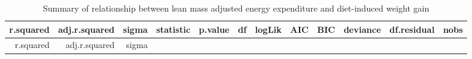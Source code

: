\documentclass[]{article}
\begin{document}
\begin{longtable}[]{@{}rrrrrrrrrrrr@{}}
\caption{Summary of relationship between lean mass adjusted energy
expenditure and diet-induced weight gain}\tabularnewline
\toprule
\begin{minipage}[b]{0.08\columnwidth}\raggedleft
r.squared\strut
\end{minipage} & \begin{minipage}[b]{0.11\columnwidth}\raggedleft
adj.r.squared\strut
\end{minipage} & \begin{minipage}[b]{0.05\columnwidth}\raggedleft
sigma\strut
\end{minipage} & \begin{minipage}[b]{0.08\columnwidth}\raggedleft
statistic\strut
\end{minipage} & \begin{minipage}[b]{0.06\columnwidth}\raggedleft
p.value\strut
\end{minipage} & \begin{minipage}[b]{0.02\columnwidth}\raggedleft
df\strut
\end{minipage} & \begin{minipage}[b]{0.05\columnwidth}\raggedleft
logLik\strut
\end{minipage} & \begin{minipage}[b]{0.03\columnwidth}\raggedleft
AIC\strut
\end{minipage} & \begin{minipage}[b]{0.03\columnwidth}\raggedleft
BIC\strut
\end{minipage} & \begin{minipage}[b]{0.07\columnwidth}\raggedleft
deviance\strut
\end{minipage} & \begin{minipage}[b]{0.09\columnwidth}\raggedleft
df.residual\strut
\end{minipage} & \begin{minipage}[b]{0.04\columnwidth}\raggedleft
nobs\strut
\end{minipage}\tabularnewline
\midrule
\endfirsthead
\toprule
\begin{minipage}[b]{0.08\columnwidth}\raggedleft
r.squared\strut
\end{minipage} & \begin{minipage}[b]{0.11\columnwidth}\raggedleft
adj.r.squared\strut
\end{minipage} & \begin{minipage}[b]{0.05\columnwidth}\raggedleft
sigma\strut

\end{minipage}
\end{longtable}
\end{document}
